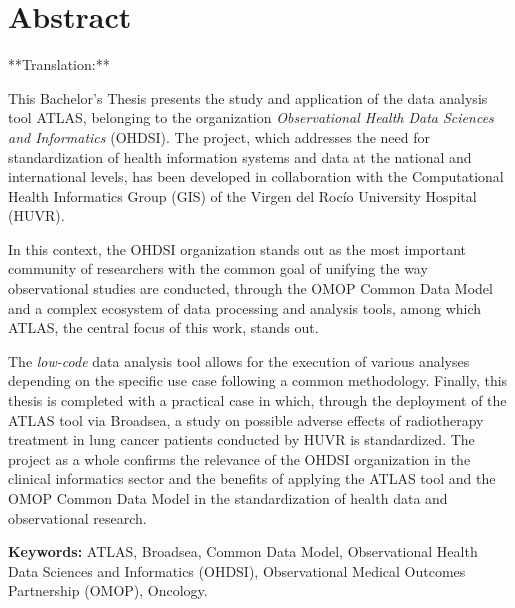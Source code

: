 \chapter*{Abstract}

**Translation:**

This Bachelor's Thesis presents the study and application of the data analysis tool ATLAS, belonging to the organization \textit{Observational Health Data Sciences and Informatics} (OHDSI). The project, which addresses the need for standardization of health information systems and data at the national and international levels, has been developed in collaboration with the Computational Health Informatics Group (GIS) of the Virgen del Rocío University Hospital (HUVR).

In this context, the OHDSI organization stands out as the most important community of researchers with the common goal of unifying the way observational studies are conducted, through the OMOP Common Data Model and a complex ecosystem of data processing and analysis tools, among which ATLAS, the central focus of this work, stands out.

The \textit{low-code} data analysis tool allows for the execution of various analyses depending on the specific use case following a common methodology. Finally, this thesis is completed with a practical case in which, through the deployment of the ATLAS tool via Broadsea, a study on possible adverse effects of radiotherapy treatment in lung cancer patients conducted by HUVR is standardized. The project as a whole confirms the relevance of the OHDSI organization in the clinical informatics sector and the benefits of applying the ATLAS tool and the OMOP Common Data Model in the standardization of health data and observational research.


\vspace{.5cm}

\textbf{Keywords:} ATLAS, Broadsea, Common Data Model, Observational Health Data Sciences and Informatics (OHDSI), Observational Medical Outcomes Partnership (OMOP), Oncology.